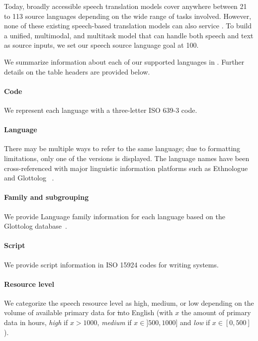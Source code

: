 
Today, broadly accessible speech translation models cover anywhere between 21 \citep{google_usm} to 113 \citep{Rubenstein2023AudioPaLMAL} source languages depending on the wide range of tasks involved. However, none of these existing speech-based translation models can also service \mt. 
To build a unified, multimodal, and multitask model that can handle both speech and text as source inputs, we set our speech source language goal at 100. 

We summarize information about each of our supported languages in . Further details on the table headers are provided below.

\paragraph{Code}
We represent each language with a three-letter ISO 639-3 code. 

\paragraph{Language}
There may be multiple ways to refer to the same language; due to formatting limitations, only one of the versions is displayed. The language names have been cross-referenced with major linguistic information platforms such as Ethnologue~\citep{ethnologue2009} and Glottolog ~\citep{glottolog2022}.

\paragraph{Family and subgrouping}
We provide Language family information for each language based on the Glottolog database~\citep{glottolog2022}.

\paragraph{Script}
We provide script information in ISO 15924 codes for writing systems. 

\paragraph{Resource level} We categorize the speech resource level as high, medium, or low depending on the volume of available primary data for \st into English (with $x$ the amount of primary data in hours, \textit{high} if $x>1000$, \textit{medium} if $x\in]500, 1000]$ and \textit{low} if $x\in[0, 500]$).

